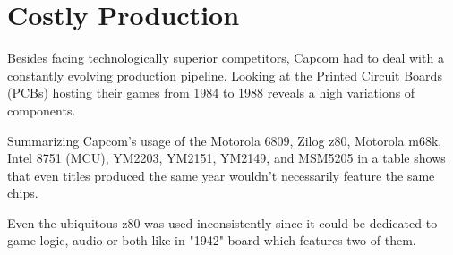 \section{Costly Production}
Besides facing technologically superior competitors, Capcom had to deal with a constantly evolving production pipeline. Looking at the Printed Circuit Boards (PCBs) hosting their games from 1984 to 1988 reveals a high variations of components.

Summarizing Capcom's usage of the Motorola 6809, Zilog z80, Motorola m68k, Intel 8751 (MCU), YM2203, YM2151, YM2149, and MSM5205 in a table shows that even titles produced the same year wouldn't necessarily feature the same chips. 

Even the ubiquitous z80 was used inconsistently since it could be dedicated to game logic, audio or both like in "1942" board which features two of them.



